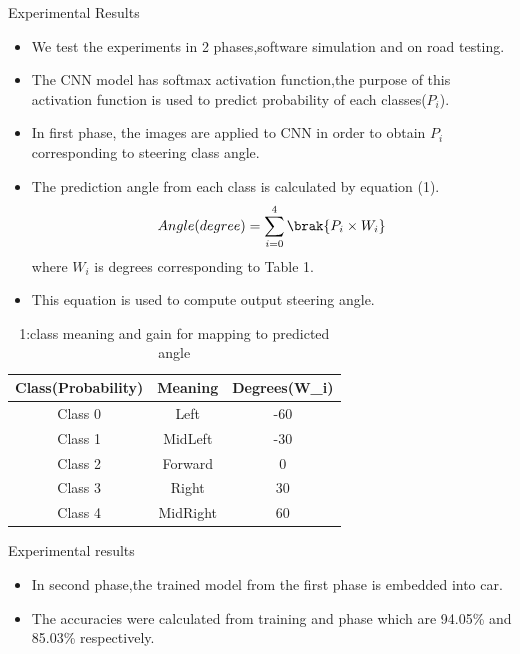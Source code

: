 \documentclass{beamer}
\begin{document}
\begin{frame}
\begin{block}{Experimental Results}
\begin{itemize}
    \item We test the experiments in 2 phases,software simulation and on road testing.
    \item The CNN model has softmax activation function,the purpose of this activation function is used to predict probability of each classes($P_i$).
    \item In first phase, the images are applied to CNN in order to obtain $P_i$
    corresponding to steering class angle.
    \item The prediction angle from each class is calculated by equation (1).
    \begin{align}
        Angle(degree)=\sum_{i=0}^{4} \brak{P_i \times W_i}
    \end{align}
    where $W_i$ is degrees corresponding to Table 1.
    \item This equation is used to compute output steering angle.
\end{itemize} 
\end{block}
\end{frame}

\begin{frame}
\begin{table}[ht]

\centering
\begin{tabular}{|c|c|c|} \hline
     Class(Probability) & Meaning & Degrees(W_i)  \\ \hline
     Class 0 & Left & -60  \\ \hline
     Class 1 & MidLeft & -30  \\ \hline
     Class 2 & Forward & 0  \\ \hline
     Class 3 & Right & 30  \\ \hline
     Class 4 & MidRight & 60  \\ \hline
\end{tabular}
\caption{1:class meaning and gain for mapping to predicted angle}
\label{1:class meaning and gain for mapping to predicted angle}
\end{table}

\begin{block}{Experimental results}
\begin{itemize}
    \item In second phase,the trained model from the first phase is embedded into car.
    \item The accuracies were calculated from training and phase which are 94.05\% and 85.03\% respectively.
\end{itemize}
\end{block}

\end{frame}
\end{document}
